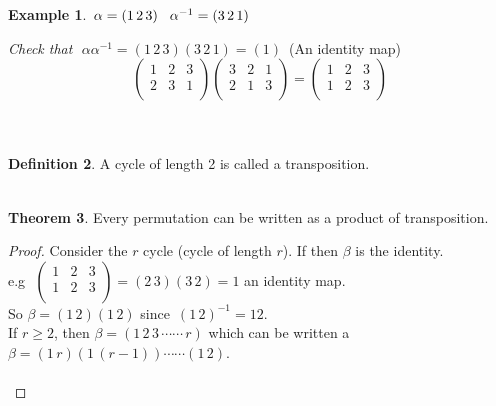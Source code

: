 \documentclass[11pt,a4paper]{article}
\theoremstyle{definition}
\newtheorem{thm}{Theorem}[subsection]
\newtheorem{defn}[thm]{Definition}
\newtheorem{exa}[thm]{Example}
\begin{document}
\begin{exa}
$\, \alpha = (1\, 2\,3)\hspace{0.3cm} \alpha^{-1} = (3\, 2\, 1)$\\
\end{exa}

\textit{Check that} $\, \, \alpha\alpha^{-1} = (1\,2\, 3)(3\,2\,1) = (1)\,$ (An identity map)
$$\begin{pmatrix}
1 & 2 & 3 \\
2 & 3 & 1\\
\end{pmatrix}\begin{pmatrix}
3 & 2 & 1\\
2 & 1 & 3\\
\end{pmatrix} = \begin{pmatrix}
1 & 2 & 3\\
1 & 2 & 3\\
\end{pmatrix}$$\\\\





\begin{defn}
A cycle of length 2 is called a transposition.\\\\
\end{defn}






\begin{thm}
Every permutation can be written as a product of transposition.\\
\end{thm}

\begin{proof}
Consider the $r$ cycle (cycle of length $r$). If then $\beta$ is the identity.\\
e.g $\, \, \begin{pmatrix}
1 & 2 & 3\\
1 & 2 & 3\\
\end{pmatrix} = (2\,3)(3\,2) = 1$ an identity map.\\
So $\beta = (1\,2)(1\,2)$ since $\, (1\, 2)^{-1} = 12$.\\
If $r\geq 2$, then $\beta = (1\, 2\, 3\,\cdots\cdots\, r)$ which can be written a $\beta = (1\,r)(1\,(r-1))\cdots\cdots (1\,2)$.\\\\
\end{proof}
\end{document}
